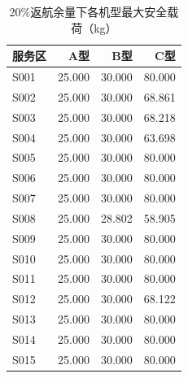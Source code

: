 \begin{table}[htbp]
\centering
\caption{20\%返航余量下各机型最大安全载荷（kg）}
\label{tab:q1:capacity}
\begin{tabular}{lrrr}
\toprule
服务区 & A型 & B型 & C型 \\
\midrule
S001 & 25.000 & 30.000 & 80.000 \\
S002 & 25.000 & 30.000 & 68.861 \\
S003 & 25.000 & 30.000 & 68.218 \\
S004 & 25.000 & 30.000 & 63.698 \\
S005 & 25.000 & 30.000 & 80.000 \\
S006 & 25.000 & 30.000 & 80.000 \\
S007 & 25.000 & 30.000 & 80.000 \\
S008 & 25.000 & 28.802 & 58.905 \\
S009 & 25.000 & 30.000 & 80.000 \\
S010 & 25.000 & 30.000 & 80.000 \\
S011 & 25.000 & 30.000 & 80.000 \\
S012 & 25.000 & 30.000 & 68.122 \\
S013 & 25.000 & 30.000 & 80.000 \\
S014 & 25.000 & 30.000 & 80.000 \\
S015 & 25.000 & 30.000 & 80.000 \\
\bottomrule
\end{tabular}
\end{table}
